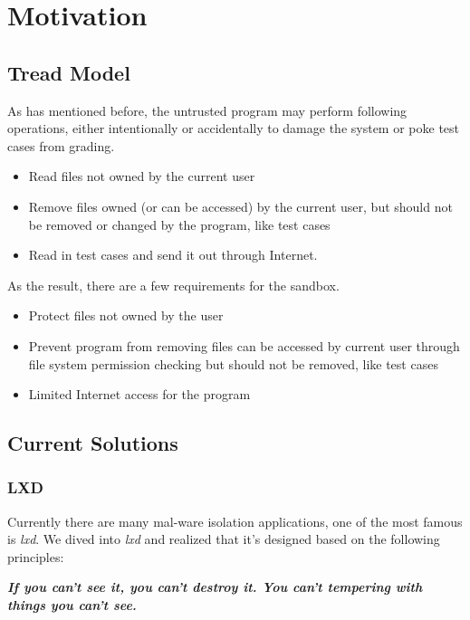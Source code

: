 \documentclass[conference,compsoc]{IEEEtran}
\begin{document}
\section {Motivation}
	\subsection{Tread Model}
		\par
			As has mentioned before, the untrusted program may perform following operations, either intentionally or accidentally to damage the system or poke test cases from grading.
			\begin{itemize}
				\item {Read files not owned by the current user}
				\item {Remove files owned (or can be accessed) by the current user, but should not be removed or changed by the program, like test cases}
				\item {Read in test cases and send it out through Internet.}
			\end{itemize}
		\par
			As the result, there are a few requirements for the sandbox.
			\begin{itemize}
				\item {Protect files not owned by the user}
				\item {Prevent program from removing files can be accessed by current user through file system permission checking but should not be removed, like test cases}
				\item {Limited Internet access for the program}
			\end{itemize}
	\subsection{Current Solutions}
		\subsubsection{LXD}
			\par
				Currently there are many mal-ware isolation applications, one of the most famous is \emph{lxd}. 
				We dived into \emph{lxd} and realized that it's designed based on the following principles:
			\par
				\emph{\textbf{
					If you can't see it, you can't destroy it. 
					You can't tempering with things you can't see.
				}}
\end{document}
